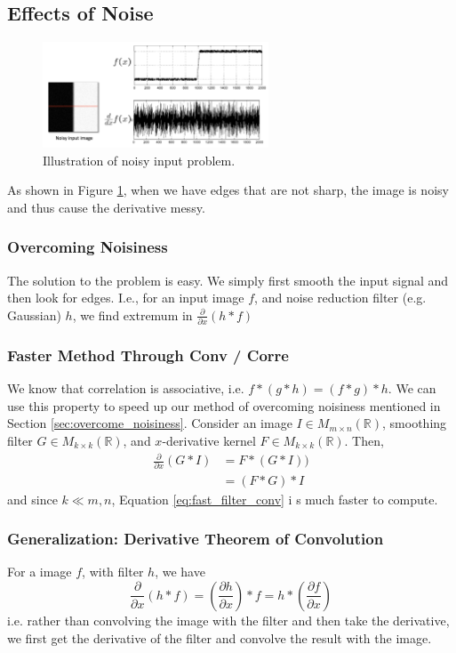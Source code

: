 \documentclass[11pt]{article}
\newcommand{\R}{\mathbb{R}}
\newcommand{\mat}[2]{M_{#1 \times #2}(\R)}
\begin{document}
\subsection{Effects of Noise}
\begin{figure}[H]
	\center\includegraphics[width=0.6\textwidth]{figs/noisy_input}
	\caption{\label{fig:noisy_input}Illustration of noisy input problem.}
\end{figure}
As shown in Figure \ref{fig:noisy_input}, when we have edges that are not sharp, the image is noisy and thus cause the derivative messy. 

\subsubsection{Overcoming Noisiness \label{sec:overcome_noisiness}}
The solution to the problem is easy. We simply first smooth the input signal and then look for edges. I.e., for an input image $f$, and noise reduction filter (e.g. Gaussian) $h$, we find extremum in $\frac{\partial }{\partial x}\left( h \ast f \right)$

\subsubsection{Faster Method Through Conv / Corre}
We know that correlation is associative, i.e. $f *(g * h)=(f * g) * h$. We can use this property to speed up our method of overcoming noisiness mentioned in Section \ref{sec:overcome_noisiness}. Consider an image $I\in \mat{m}{n}$, smoothing filter $G\in \mat{k}{k}$, and $x$-derivative kernel $F \in \mat{k}{k}$. Then, 
\begin{align}
	\frac{\partial }{\partial x} (G \ast I) 
	&= F \ast ( G \ast I )) \\
	&= (F \ast G) \ast I\label{eq:fast_filter_conv}
\end{align}
and since $k \ll m, n$, Equation \ref{eq:fast_filter_conv} i  s much faster to compute. 

\subsubsection{Generalization: Derivative Theorem of Convolution}
For a image $f$, with filter $h$, we have
\begin{equation}
	\frac{\partial}{\partial x}(h * f)=\left(\frac{\partial h}{\partial x}\right) * f=h *\left(\frac{\partial f}{\partial x}\right)
\end{equation}
i.e. rather than convolving the image with the filter and then take the derivative, we first get the derivative of the filter and convolve the result with the image. 
\end{document}

